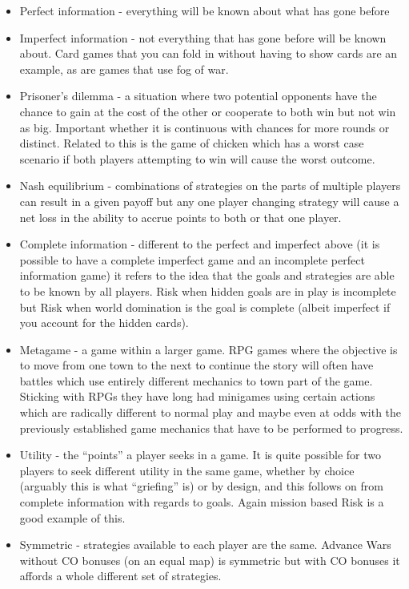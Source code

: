 \documentclass[
]{book}
\providecommand{\tightlist}{%
  \setlength{\itemsep}{0pt}\setlength{\parskip}{0pt}}
\begin{document}
\begin{itemize}
\tightlist
\item
  Perfect information - everything will be known about what has gone before
\item
  Imperfect information - not everything that has gone before will be known about. Card games that you can fold in without having to show cards are an example, as are games that use fog of war.
\item
  Prisoner's dilemma - a situation where two potential opponents have the chance to gain at the cost of the other or cooperate to both win but not win as big. Important whether it is continuous with chances for more rounds or distinct. Related to this is the game of chicken which has a worst case scenario if both players attempting to win will cause the worst outcome.
\item
  Nash equilibrium - combinations of strategies on the parts of multiple players can result in a given payoff but any one player changing strategy will cause a net loss in the ability to accrue points to both or that one player.
\item
  Complete information - different to the perfect and imperfect above (it is possible to have a complete imperfect game and an incomplete perfect information game) it refers to the idea that the goals and strategies are able to be known by all players. Risk when hidden goals are in play is incomplete but Risk when world domination is the goal is complete (albeit imperfect if you account for the hidden cards).
\item
  Metagame - a game within a larger game. RPG games where the objective is to move from one town to the next to continue the story will often have battles which use entirely different mechanics to town part of the game. Sticking with RPGs they have long had minigames using certain actions which are radically different to normal play and maybe even at odds with the previously established game mechanics that have to be performed to progress.
\item
  Utility - the ``points'' a player seeks in a game. It is quite possible for two players to seek different utility in the same game, whether by choice (arguably this is what ``griefing'' is) or by design, and this follows on from complete information with regards to goals. Again mission based Risk is a good example of this.
\item
  Symmetric - strategies available to each player are the same. Advance Wars without CO bonuses (on an equal map) is symmetric but with CO bonuses it affords a whole different set of strategies.

\end{itemize}
\end{document}
